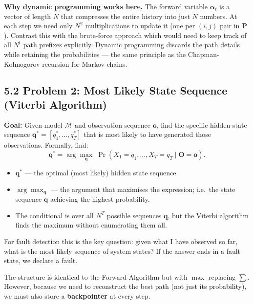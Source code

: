 \documentclass[12pt, a4paper]{article}
\begin{document}
\begin{notebox}
  \textbf{Why dynamic programming works here.}
  The forward variable $\boldsymbol{\alpha}_t$ is a vector of length $N$ that
  compresses the entire history into just $N$ numbers. At each step we need
  only $N^2$ multiplications to update it (one per $(i,j)$ pair in $\mathbf{P}$).
  Contrast this with the brute-force approach which would need to keep track
  of all $N^t$ path prefixes explicitly. Dynamic programming discards the
  path details while retaining the probabilities --- the same principle as the
  Chapman-Kolmogorov recursion for Markov chains.
\end{notebox}

\subsection*{5.2 \quad Problem 2: Most Likely State Sequence (Viterbi Algorithm)}

\textbf{Goal:} Given model $\mathcal{M}$ and observation sequence $\mathbf{o}$,
find the specific hidden-state sequence $\mathbf{q}^* = [q_1^*, \ldots, q_T^*]$
that is most likely to have generated those observations. Formally, find:
\[
  \mathbf{q}^* = \arg\max_{\mathbf{q}} \;\Pr(X_1=q_1, \ldots, X_T=q_T
  \mid \mathbf{O}=\mathbf{o}).
\]
\begin{itemize}[leftmargin=1.4em, itemsep=2pt]
  \item $\mathbf{q}^*$ --- the optimal (most likely) hidden state sequence.
  \item $\arg\max_{\mathbf{q}}$ --- the argument that maximises the expression;
    i.e.\ the state sequence $\mathbf{q}$ achieving the highest probability.
  \item The conditional is over all $N^T$ possible sequences $\mathbf{q}$,
    but the Viterbi algorithm finds the maximum without enumerating them all.
\end{itemize}

For fault detection this is the key question: given what I have observed so
far, what is the most likely sequence of system states? If the answer ends in
a fault state, we declare a fault.

The structure is identical to the Forward Algorithm but with $\max$ replacing
$\sum$. However, because we need to reconstruct the best path (not just its
probability), we must also store a \textbf{backpointer} at every step.
\end{document}
